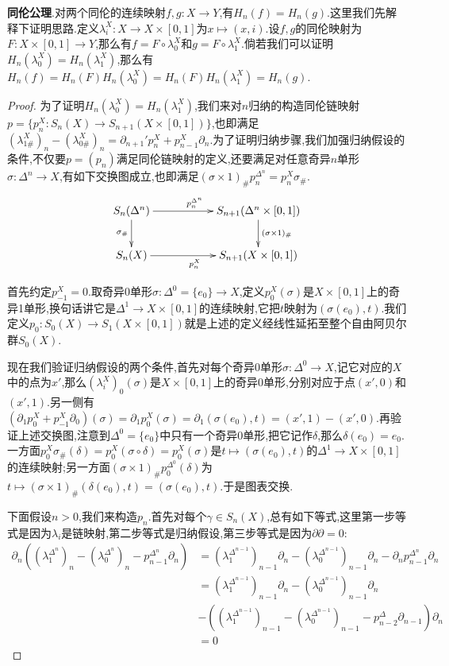 \textbf{同伦公理}.对两个同伦的连续映射$f,g:X\to Y$,有$H_n(f)=H_n(g)$.这里我们先解释下证明思路.定义$\lambda_i^X:X\to X\times[0,1]$为$x\mapsto(x,i)$.设$f,g$的同伦映射为$F:X\times[0,1]\to Y$,那么有$f=F\circ\lambda_0^X$和$g=F\circ\lambda_1^X$.倘若我们可以证明$H_n(\lambda_0^X)=H_n(\lambda_1^X)$,那么有$H_n(f)=H_n(F)H_n(\lambda_0^X)=H_n(F)H_n(\lambda_1^X)=H_n(g)$.
\begin{proof}
    
    为了证明$H_n(\lambda_0^X)=H_n(\lambda_1^X)$,我们来对$n$归纳的构造同伦链映射$p=\{p_n^X:S_n(X)\to S_{n+1}(X\times[0,1])\}$,也即满足$(\lambda_{1\#}^X)_n-(\lambda_{0\#}^X)_n=\partial_{n+1}'p_n^X+p_{n-1}^X\partial_n$.为了证明归纳步骤,我们加强归纳假设的条件,不仅要$p=(p_n)$满足同伦链映射的定义,还要满足对任意奇异$n$单形$\sigma:\Delta^n\to X$,有如下交换图成立,也即满足$(\sigma\times1)_{\#}p_n^{\Delta^n}=p_n^X\sigma_{\#}$.
	$$\xymatrix{S_n(\Delta^n)\ar[rr]^{p_n^{\Delta^n}}\ar[d]_{\sigma_{\#}}&&S_{n+1}(\Delta^n\times[0,1])\ar[d]^{(\sigma\times1)_{\#}}\\S_n(X)\ar[rr]_{p_n^X}&&S_{n+1}(X\times[0,1])}$$
	
	首先约定$p_{-1}^X=0$.取奇异0单形$\sigma:\Delta^0=\{e_0\}\to X$,定义$p_0^X(\sigma)$是$X\times[0,1]$上的奇异1单形,换句话讲它是$\Delta^1\to X\times[0,1]$的连续映射,它把$t$映射为$(\sigma(e_0),t)$.我们定义$p_0:S_0(X)\to S_1(X\times[0,1])$就是上述的定义经线性延拓至整个自由阿贝尔群$S_0(X)$.
	
	现在我们验证归纳假设的两个条件,首先对每个奇异$0$单形$\sigma:\Delta^0\to X$,记它对应的$X$中的点为$x'$,那么$(\lambda_i^X)_0(\sigma)$是$X\times[0,1]$上的奇异0单形,分别对应于点$(x',0)$和$(x',1)$.另一侧有$(\partial_1p_0^X+p_{-1}^X\partial_0)(\sigma)=\partial_1p_0^X(\sigma)=\partial_1(\sigma(e_0),t)=(x',1)-(x',0)$.再验证上述交换图,注意到$\Delta^0=\{e_0\}$中只有一个奇异0单形,把它记作$\delta$,那么$\delta(e_0)=e_0$.一方面$p_0^X\sigma_{\#}(\delta)=p_0^X(\sigma\circ\delta)=p_0^X(\sigma)$是$t\mapsto(\sigma(e_0),t)$的$\Delta^1\to X\times[0,1]$的连续映射;另一方面$(\sigma\times1)_{\#}p_0^{\Delta^0}(\delta)$为$t\mapsto(\sigma\times1)_{\#}(\delta(e_0),t)=(\sigma(e_0),t)$.于是图表交换.
	
	下面假设$n>0$,我们来构造$p_n$.首先对每个$\gamma\in S_n(X)$,总有如下等式,这里第一步等式是因为$\lambda_i$是链映射,第二步等式是归纳假设,第三步等式是因为$\partial\partial=0$:
	\begin{align*}
	\partial_n((\lambda_1^{\Delta^n})_n-(\lambda_0^{\Delta^n})_n-p_{n-1}^{\Delta^n}\partial_n)&=(\lambda_1^{\Delta^{n-1}})_{n-1}\partial_n-(\lambda_0^{\Delta^{n-1}})_{n-1}\partial_n-\partial_np_{n-1}^{\Delta^n}\partial_n\\
	&=(\lambda_1^{\Delta^{n-1}})_{n-1}\partial_n-(\lambda_0^{\Delta^{n-1}})_{n-1}\partial_n\\&-\left((\lambda_1^{\Delta^{n-1}})_{n-1}-(\lambda_0^{\Delta^{n-1}})_{n-1}-p_{n-2}^{\Delta}\partial_{n-1}\right)\partial_n\\&=0
	\end{align*}
	

\end{proof}
